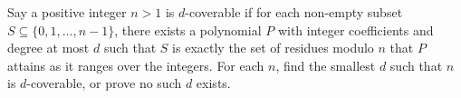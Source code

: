 Say a positive integer $n>1$ is $d$-coverable if for each non-empty subset $S\subseteq \{0, 1, \ldots, n-1\}$, there exists a polynomial  $P$ with integer coefficients and degree at most $d$ such that $S$ is exactly the set of residues modulo $n$ that $P$ attains as it ranges over the integers. For each $n$, find the smallest $d$ such that $n$ is $d$-coverable, or prove no such $d$ exists.

